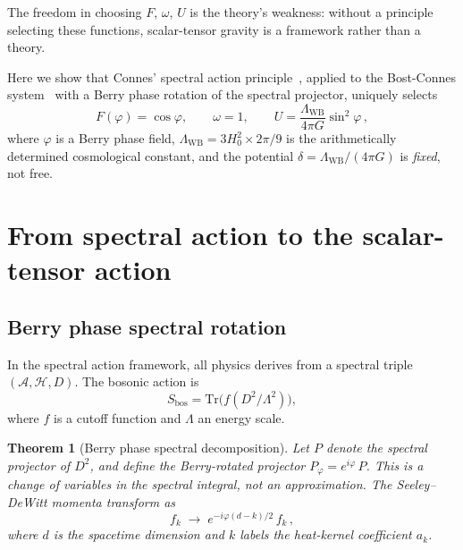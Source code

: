 \documentclass[aps,prd,twocolumn,superscriptaddress,nofootinbib]{revtex4-2}
\newcommand{\Tr}{\mathrm{Tr}}
\newcommand{\Lw}{\Lambda_{\mathrm{WB}}}
\newtheorem{theorem}{Theorem}
\begin{document}
The freedom in choosing $F$, $\omega$, $U$ is the theory's weakness:
without a principle selecting these functions, scalar-tensor gravity
is a framework rather than a theory.

Here we show that Connes' spectral action principle~\cite{Chamseddine1996},
applied to the Bost-Connes system~\cite{BostConnes1995}
with a Berry phase rotation of the spectral projector,
uniquely selects
\begin{equation}
  F(\varphi) = \cos\varphi, \qquad
  \omega = 1, \qquad
  U = \frac{\Lw}{4\pi G}\sin^2\varphi\,,
  \label{eq:WB_choice}
\end{equation}
where $\varphi$ is a Berry phase field,
$\Lw = 3H_0^2 \times 2\pi/9$ is the arithmetically
determined cosmological constant, and the potential
$\delta = \Lw/(4\pi G)$ is \emph{fixed}, not free.

\section{From spectral action to the scalar-tensor action}
\label{sec:derivation}

\subsection{Berry phase spectral rotation}

In the spectral action framework, all physics derives from a
spectral triple $(\mathcal{A}, \mathcal{H}, D)$.
The bosonic action is~\cite{Chamseddine1996}
\begin{equation}
  S_{\mathrm{bos}} = \Tr\bigl(f(D^2/\Lambda^2)\bigr),
\end{equation}
where $f$ is a cutoff function and $\Lambda$ an energy scale.

\begin{theorem}[Berry phase spectral decomposition]
\label{thm:berry}
Let $P$ denote the spectral projector of $D^2$, and define
the Berry-rotated projector $P_\varphi = e^{i\varphi}\,P$.
This is a change of variables in the spectral integral,
not an approximation.  The Seeley--DeWitt momenta transform as
\begin{equation}
  \boxed{\;
  f_k \;\longrightarrow\; e^{-i\varphi(d-k)/2}\,f_k\,,
  \;}
  \label{eq:berry_fk}
\end{equation}
where $d$ is the spacetime dimension and $k$ labels the
heat-kernel coefficient $a_k$.
\end{theorem}
\end{document}
